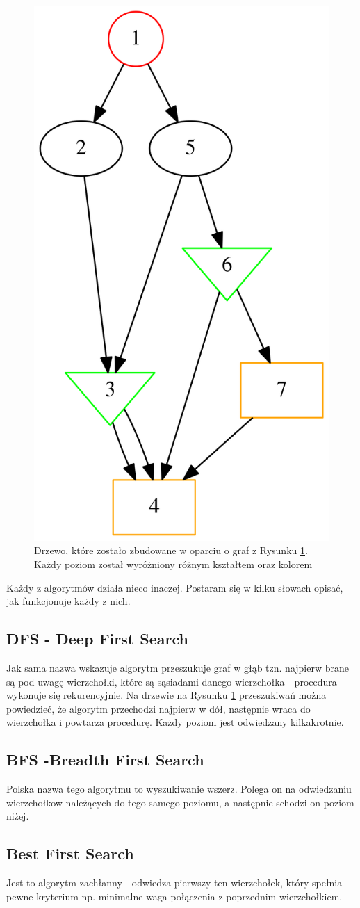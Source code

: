 \documentclass[10pt,a4paper]{article}
\begin{document}
\begin{figure}[H]
\centering
\includegraphics[height=0.7\linewidth]{./Wykresy/drzewo}
\caption{Drzewo, które zostało zbudowane w oparciu o graf z 
Rysunku \ref{fig:drzewo}. Każdy poziom został wyróżniony różnym 
kształtem oraz kolorem }
\label{fig:drzewo}
\end{figure}


Każdy z algorytmów działa nieco inaczej. Postaram się w kilku
słowach opisać, jak funkcjonuje każdy z nich.

\subsection{DFS - Deep First Search}
Jak sama nazwa wskazuje algorytm przeszukuje graf w
głąb tzn. najpierw brane są pod uwagę wierzchołki, które są
sąsiadami danego wierzchołka - procedura wykonuje się rekurencyjnie.
Na drzewie na Rysunku \ref{fig:drzewo} przeszukiwań można powiedzieć, że algorytm przechodzi
najpierw w dół, następnie wraca do wierzchołka i powtarza procedurę.
Każdy poziom jest odwiedzany kilkakrotnie.

\subsection{BFS -Breadth First Search }
Polska nazwa tego algorytmu to wyszukiwanie wszerz. Polega on na
odwiedzaniu wierzchołkow należących do tego samego poziomu, a
następnie schodzi on poziom niżej.


\subsection{Best First Search}
Jest to algorytm zachłanny - odwiedza pierwszy ten wierzchołek, 
który spełnia pewne kryterium np. minimalne waga połączenia z 
poprzednim wierzchołkiem.
\end{document}
